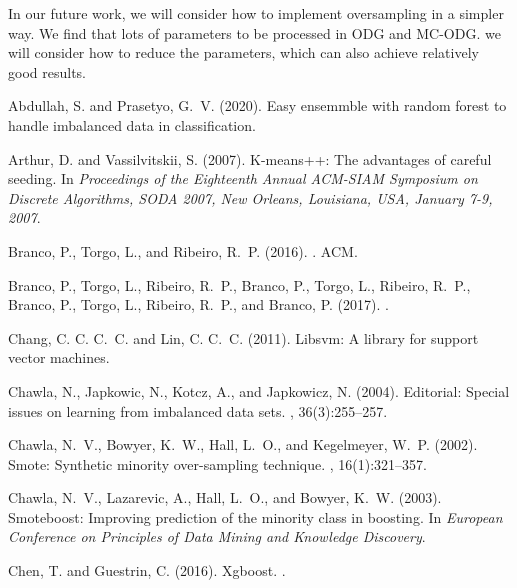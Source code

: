 \documentclass[runningheads]{llncs}
\begin{document}
In our future work, we will consider how to implement oversampling in a simpler way.
We find that lots of parameters to be processed in ODG and MC-ODG. 
we will consider how to reduce the parameters, which can also achieve relatively good results.
\begin{thebibliography}{8}
  Abdullah, S. and Prasetyo, G.~V. (2020).
  \newblock Easy ensemmble with random forest to handle imbalanced data in
    classification.
  
  Arthur, D. and Vassilvitskii, S. (2007).
  \newblock K-means++: The advantages of careful seeding.
  \newblock In {\em Proceedings of the Eighteenth Annual ACM-SIAM Symposium on
    Discrete Algorithms, SODA 2007, New Orleans, Louisiana, USA, January 7-9,
    2007}.
  
  Branco, P., Torgo, L., and Ribeiro, R.~P. (2016).
  .
  \newblock ACM.
  
  Branco, P., Torgo, L., Ribeiro, R.~P., Branco, P., Torgo, L., Ribeiro, R.~P.,
    Branco, P., Torgo, L., Ribeiro, R.~P., and Branco, P. (2017).
  .
  
  Chang, C. C. C.~C. and Lin, C. C.~C. (2011).
  \newblock Libsvm: A library for support vector machines.
  
  Chawla, N., Japkowic, N., Kotcz, A., and Japkowicz, N. (2004).
  \newblock Editorial: Special issues on learning from imbalanced data sets.
  , 36(3):255--257.
  
  Chawla, N.~V., Bowyer, K.~W., Hall, L.~O., and Kegelmeyer, W.~P. (2002).
  \newblock Smote: Synthetic minority over-sampling technique.
  , 16(1):321--357.
  
  Chawla, N.~V., Lazarevic, A., Hall, L.~O., and Bowyer, K.~W. (2003).
  \newblock Smoteboost: Improving prediction of the minority class in boosting.
  \newblock In {\em European Conference on Principles of Data Mining and
    Knowledge Discovery}.
  
  Chen, T. and Guestrin, C. (2016).
  \newblock Xgboost.
  .
  

\end{thebibliography}
\end{document}
